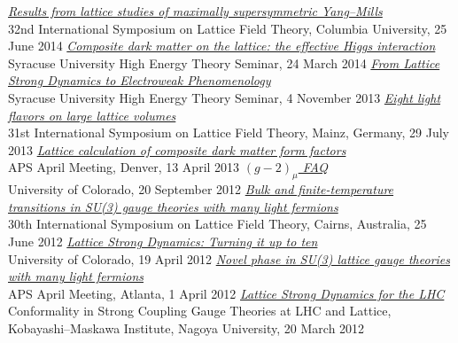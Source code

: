 \begin{spacelistout}
\begin{revnumerate}
    \pagebreakitem
      \textit{\href{http://www.davidschaich.net/talks/lattice14.pdf}{Results from lattice studies of maximally supersymmetric Yang--Mills}} \\
      32nd International Symposium on Lattice Field Theory, Columbia University, 25 June 2014
    \pagebreakitem
      \textit{\href{http://www.davidschaich.net/talks/LSD_SU4_1403.pdf}{Composite dark matter on the lattice: the effective Higgs interaction}} \\
      Syracuse University High Energy Theory Seminar, 24 March 2014
    \pagebreakitem
      \textit{\href{http://www.davidschaich.net/talks/LSD_EFT13.pdf}{From Lattice Strong Dynamics to Electroweak Phenomenology}} \\
      Syracuse University High Energy Theory Seminar, 4 November 2013
    \pagebreakitem
      \textit{\href{http://www.davidschaich.net/talks/lattice13.pdf}{Eight light flavors on large lattice volumes}} \\
      31st International Symposium on Lattice Field Theory, Mainz, Germany, 29 July 2013
    \pagebreakitem
      \textit{\href{http://www.davidschaich.net/talks/April13.pdf}{Lattice calculation of composite dark matter form factors}} \\
      APS April Meeting, Denver, 13 April 2013
    \pagebreakitem
      \textit{\href{http://www.davidschaich.net/talks/g-2_1209.pdf}{$(g - 2)_{\mu}$ FAQ}} \\
      University of Colorado, 20 September 2012
    \pagebreakitem
      \textit{\href{http://www.davidschaich.net/talks/lattice12.pdf}{Bulk and finite-temperature transitions in SU(3) gauge theories with many light fermions}} \\
      30th International Symposium on Lattice Field Theory, Cairns, Australia, 25 June 2012
    \pagebreakitem
      \textit{\href{http://www.davidschaich.net/talks/LSD10f_1204.pdf}{Lattice Strong Dynamics: Turning it up to ten}} \\
      University of Colorado, 19 April 2012
    \pagebreakitem
      \textit{\href{http://www.davidschaich.net/talks/April12}{Novel phase in SU(3) lattice gauge theories with many light fermions}} \\
      APS April Meeting, Atlanta, 1 April 2012
    \pagebreakitem
      \textit{\href{http://www.davidschaich.net/talks/SCGT12Mini.pdf}{Lattice Strong Dynamics for the LHC}} \\
      Conformality in Strong Coupling Gauge Theories at LHC and Lattice, \\ Kobayashi--Maskawa Institute, Nagoya University, 20 March 2012

\end{revnumerate}
\end{spacelistout}
